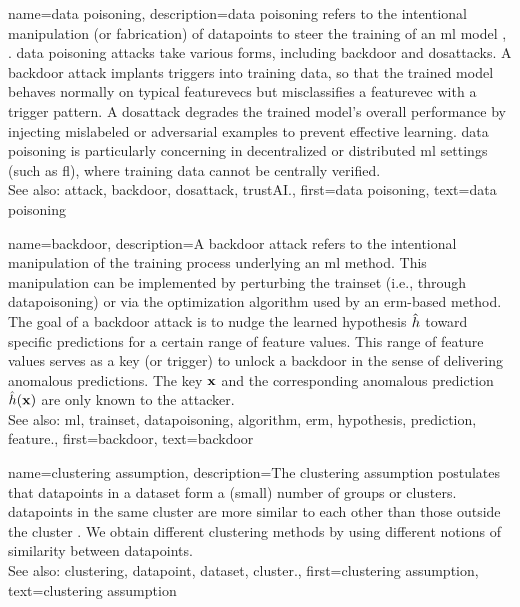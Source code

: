 {name={data poisoning}, 
	description={\Gls{data} poisoning refers to the intentional manipulation 
  		(or fabrication) of \glspl{datapoint} to steer the training of an \gls{ml} \gls{model} \cite{Liu2021}, \cite{PoisonGAN}. 
  		\Gls{data} poisoning \glspl{attack} take various forms, including \gls{backdoor} and \glspl{dosattack}.
  		A \gls{backdoor} \gls{attack} implants triggers into training \gls{data}, so that the trained \gls{model} 
  		behaves normally on typical \glspl{featurevec} but misclassifies a \gls{featurevec} with a trigger pattern.
  		A \gls{dosattack} degrades the trained \gls{model}'s overall performance by injecting mislabeled or 
  		adversarial examples to prevent effective learning.
		\Gls{data} poisoning is particularly concerning in decentralized or distributed \gls{ml} settings (such as \gls{fl}), 
		where training \gls{data} cannot be centrally verified.
				\\
		See also: \gls{attack}, \gls{backdoor}, \gls{dosattack}, \gls{trustAI}.},
	first={data poisoning},
	text={data poisoning} 
}
	
	
{name={backdoor}, 
	description={A backdoor attack refers 
		to the intentional manipulation of the training process underlying an \gls{ml} method. This manipulation 
		can be implemented by perturbing the \gls{trainset} (i.e., through \gls{datapoisoning}) or via the 
		optimization \gls{algorithm} used by an \gls{erm}-based method. The goal of a 
		backdoor attack is to nudge the learned \gls{hypothesis} $\hat{h}$ 
		toward specific \glspl{prediction} for a certain range of \gls{feature} values. This range of \gls{feature} 
		values serves as a key (or trigger) to unlock a backdoor in the sense of 
		delivering anomalous \glspl{prediction}. The key ${\bf x}$ and the corresponding 
		anomalous \gls{prediction} $\hat{h}({\bf x})$ are only known to the attacker.
				\\
		See also: \gls{ml}, \gls{trainset}, \gls{datapoisoning}, \gls{algorithm}, \gls{erm}, \gls{hypothesis}, \gls{prediction}, \gls{feature}.},
	first={backdoor},
	text={backdoor} 
}


{name={clustering assumption}, 
	description={The 
		\gls{clustering} assumption postulates that \glspl{datapoint} in a \gls{dataset} form a (small) number of 
		groups or \glspl{cluster}. \Glspl{datapoint} in the same \gls{cluster} are more similar to each 
		other than those outside the \gls{cluster} \cite{SemiSupervisedBook}. We obtain different 
		\gls{clustering} methods by using different notions of similarity between \glspl{datapoint}.
				\\
		See also: \gls{clustering}, \gls{datapoint}, \gls{dataset}, \gls{cluster}.},
	first={clustering assumption},
	text={clustering assumption} 
}
	
